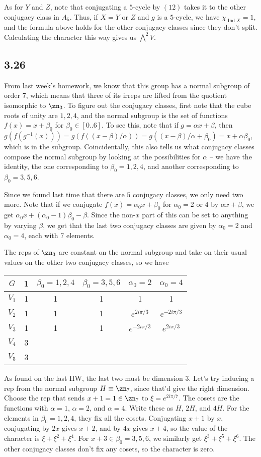 \documentclass{article}
\DeclareMathOperator{\Ind}{Ind}
\begin{document}
As for $Y$ and $Z$, note that conjugating a $5$-cycle by $(12)$ takes it to the other conjugacy class in $A_5$. Thus, if $X=Y$ or $Z$ and $g$ is a $5$-cycle, we have $\chi_{\Ind X}=1$, and the formula above holds for the other conjugacy classes since they don't split. Calculating the character this way gives us $\bigwedge^2 V$.
\subsection*{3.26}
From last week's homework, we know that this group has a normal subgroup of order $7$, which means that three of its irreps are lifted from the quotient isomorphic to $\zn_3$. To figure out the conjugacy classes, first note that the cube roots of unity are $1, 2, 4$, and the normal subgroup is the set of functions $f(x)=x+\beta_0$ for $\beta_0\in[0..6]$. To see this, note that if $g=\alpha x+\beta$, then $g(f(g^{-1}(x)))=g(f((x-\beta)/\alpha))=g((x-\beta)/\alpha+\beta_0)=x+\alpha\beta_0$, which is in the subgroup. Coincidentally, this also tells us what conjugacy classes compose the normal subgroup by looking at the possibilities for $\alpha$ -- we have the identity, the one corresponding to $\beta_0=1,2,4$, and another corresponding to $\beta_0=3,5,6$.

Since we found last time that there are $5$ conjugacy classes, we only need two more. Note that if we conjugate $f(x)=\alpha_0x+\beta_0$ for $\alpha_0=2$ or $4$ by $\alpha x+\beta$, we get $\alpha_0x+(\alpha_0-1)\beta_0-\beta$. Since the non-$x$ part of this can be set to anything by varying $\beta$, we get that the last two conjugacy classes are given by $\alpha_0=2$ and $\alpha_0=4$, each with $7$ elements.

The reps of $\zn_3$ are constant on the normal subgroup and take on their usual values on the other two conjugacy classes, so we have 

\begin{tabular}{c|ccccc}
    $G$&1&$\beta_0=1,2,4$&$\beta_0=3,5,6$&$\alpha_0=2$&$\alpha_0=4$\\
    \hline
    $V_1$&1&1&1&1&1\\
    $V_2$&1&1&1&$e^{2i\pi/3}$&$e^{-2i\pi/3}$\\
    $V_3$&1&1&1&$e^{-2i\pi/3}$&$e^{2i\pi/3}$\\
    $V_4$&3\\
    $V_5$&3\\
\end{tabular}

As found on the last HW, the last two must be dimension $3$. Let's try inducing a rep from the normal subgroup $H\equiv\zn_7$, since that'd give the right dimension. Choose the rep that sends $x+1=1\in\zn_7$ to $\xi=e^{2i\pi/7}$. The cosets are the functions with $\alpha=1$, $\alpha=2$, and $\alpha=4$. Write these as $H$, $2H$, and $4H$. For the elements in $\beta_0=1,2,4$, they fix all the cosets. Conjugating $x+1$ by $x$, conjugating by $2x$ gives $x+2$, and by $4x$ gives $x+4$, so the value of the character is $\xi+\xi^2+\xi^4$. For $x+3\in\beta_0=3,5,6$, we similarly get $\xi^3+\xi^5+\xi^6$. The other conjugacy classes don't fix any cosets, so the character is zero.
\end{document}
